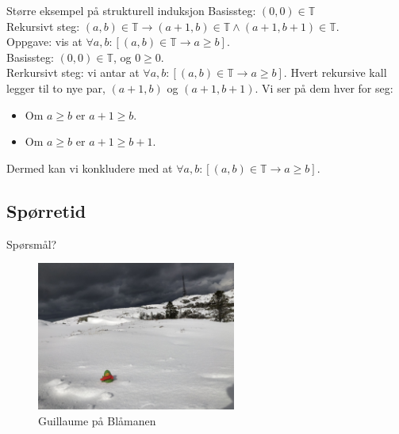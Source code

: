 \begin{frame}{Større eksempel på strukturell induksjon}
    Basissteg: $(0, 0) \in \mathbb{T}$\\
    Rekursivt steg: $(a, b) \in \mathbb{T} \rightarrow (a+1, b) \in \mathbb{T} \land (a+1, b+1) \in \mathbb{T}$.\\
    
    Oppgave: vis at $\forall a, b : [(a, b) \in \mathbb{T} \rightarrow a \geq b]$.\\
    
    \pause
    Basissteg: $(0, 0) \in \mathbb{T}$, og $0 \geq 0$. \checkmark\\
    Rerkursivt steg: vi antar at $\forall a, b : [(a, b) \in \mathbb{T} \rightarrow a \geq b]$. Hvert rekursive kall legger til to nye par, $(a+1, b)$ og $(a+1, b+1)$. Vi ser på dem hver for seg:
    \begin{itemize}
        \item Om $a \geq b$ er $a+1 \geq b$.
        \item Om $a \geq b$ er $a+1 \geq b+1$. \checkmark
    \end{itemize}
    Dermed kan vi konkludere med at $\forall a, b : [(a, b) \in \mathbb{T} \rightarrow a \geq b]$.
\end{frame}

\subsection*{Spørretid}
\begin{frame}{Spørsmål?}
    \begin{figure}
        \centering
        \includegraphics[height = 4.9cm]{images/guillaume7.jpg}
        \caption{Guillaume på Blåmanen}
        \label{fig:guillaume7a}
    \end{figure}
\end{frame}